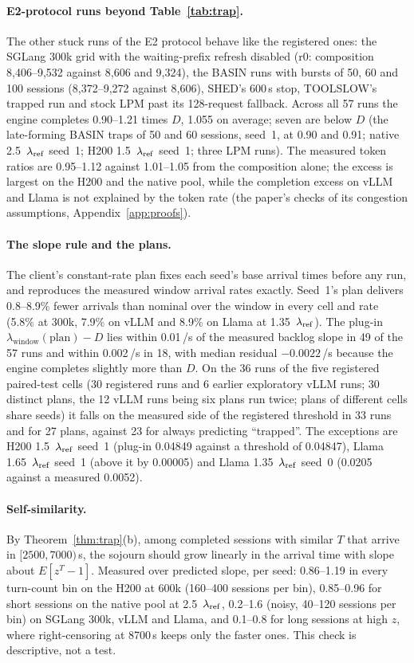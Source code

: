 \paragraph{E2-protocol runs beyond Table~\ref{tab:trap}.} The other stuck runs of the E2 protocol behave like the registered ones:
the SGLang 300k grid with the waiting-prefix refresh disabled (r0: composition 8{,}406--9{,}532 against 8{,}606 and 9{,}324), the
BASIN runs with bursts of 50, 60 and 100 sessions (8{,}372--9{,}272 against 8{,}606), SHED's 600\,s stop, TOOLSLOW's trapped run and
stock LPM past its 128-request fallback. Across all 57 runs the engine completes 0.90--1.21 times $D$, 1.055 on average; seven are
below $D$ (the late-forming BASIN traps of 50 and 60 sessions, seed~1, at 0.90 and 0.91; native 2.5~$\lambda_{\mathrm{ref}}$ seed~1; H200 1.5~$\lambda_{\mathrm{ref}}$
seed~1; three LPM runs). The measured token ratios are 0.95--1.12 against 1.01--1.05 from the composition alone; the excess is largest on the H200 and
the native pool, while the completion excess on vLLM and Llama is not explained by the token rate (the paper's checks of its
congestion assumptions, Appendix~\ref{app:proofs}).

\paragraph{The slope rule and the plans.} The client's constant-rate plan fixes each seed's base arrival times before any run, and
reproduces the measured window arrival rates exactly. Seed~1's plan delivers 0.8--8.9\% fewer arrivals than nominal over the window
in every cell and rate (5.8\% at 300k, 7.9\% on vLLM and 8.9\% on Llama at 1.35~$\lambda_{\mathrm{ref}}$). The plug-in $\lambda_{\mathrm{window}}
(\text{plan})-D$ lies within 0.01\,/s of the measured backlog slope in 49 of the 57 runs and within 0.002\,/s in 18, with median
residual $-0.0022$\,/s because the engine completes slightly more than $D$. On the 36 runs of the five registered paired-test cells (30 registered runs and 6 earlier exploratory vLLM runs; 30 distinct
plans, the 12 vLLM runs being six plans run twice; plans of different cells share seeds) it falls on the measured side of the registered threshold in 33 runs and for 27
plans, against 23 for always predicting ``trapped''. The exceptions are H200 1.5~$\lambda_{\mathrm{ref}}$ seed~1 (plug-in 0.04849 against a threshold
of 0.04847), Llama 1.65~$\lambda_{\mathrm{ref}}$ seed~1 (above it by 0.00005) and Llama 1.35~$\lambda_{\mathrm{ref}}$ seed~0 (0.0205 against a measured 0.0052).

\paragraph{Self-similarity.} By Theorem~\ref{thm:trap}(b), among completed sessions with similar $T$ that arrive in
$[2500,7000)$\,s, the sojourn should grow linearly in the arrival time with slope about $E[z^T-1]$. Measured over predicted
slope, per seed: 0.86--1.19 in every turn-count bin on the H200 at 600k (160--400 sessions per bin), 0.85--0.96 for short sessions on
the native pool at 2.5~$\lambda_{\mathrm{ref}}$, 0.2--1.6 (noisy, 40--120 sessions per bin) on SGLang 300k, vLLM and Llama, and 0.1--0.8 for long
sessions at high $z$, where right-censoring at 8700\,s keeps only the faster ones. This check is descriptive, not a test.
